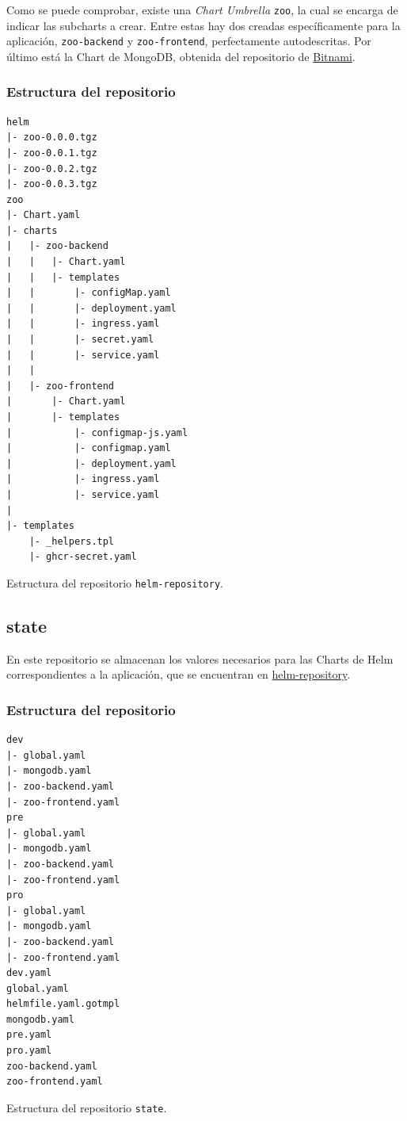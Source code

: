 Como se puede comprobar, existe una \textit{Chart Umbrella} \texttt{zoo}, la cual se encarga de indicar las subcharts a crear. Entre estas hay dos creadas específicamente para la aplicación, \texttt{zoo-backend} y \texttt{zoo-frontend}, perfectamente autodescritas. Por último está la Chart de MongoDB, obtenida del repositorio de \href{https://bitnami.com/stacks?stack=helm}{Bitnami}.

\subsubsection*{Estructura del repositorio}

\begin{longlisting}
  \begin{verbatim}
helm
|- zoo-0.0.0.tgz
|- zoo-0.0.1.tgz
|- zoo-0.0.2.tgz
|- zoo-0.0.3.tgz
zoo
|- Chart.yaml
|- charts
|   |- zoo-backend
|   |   |- Chart.yaml
|   |   |- templates
|   |       |- configMap.yaml
|   |       |- deployment.yaml
|   |       |- ingress.yaml
|   |       |- secret.yaml
|   |       |- service.yaml
|   |
|   |- zoo-frontend
|       |- Chart.yaml
|       |- templates
|           |- configmap-js.yaml
|           |- configmap.yaml
|           |- deployment.yaml
|           |- ingress.yaml
|           |- service.yaml
|   
|- templates
    |- _helpers.tpl
    |- ghcr-secret.yaml
  \end{verbatim}
  \caption{Estructura del repositorio \texttt{helm-repository}.}
\end{longlisting}

\subsection{state}

En este repositorio se almacenan los valores necesarios para las Charts de Helm correspondientes a la aplicación, que se encuentran en \href{https://github.com/vieites-tfg/helm-repository}{helm-repository}.

\subsubsection*{Estructura del repositorio}

\begin{listing}[!ht]
  \begin{verbatim}
dev
|- global.yaml
|- mongodb.yaml
|- zoo-backend.yaml
|- zoo-frontend.yaml
pre
|- global.yaml
|- mongodb.yaml
|- zoo-backend.yaml
|- zoo-frontend.yaml
pro
|- global.yaml
|- mongodb.yaml
|- zoo-backend.yaml
|- zoo-frontend.yaml
dev.yaml
global.yaml
helmfile.yaml.gotmpl
mongodb.yaml
pre.yaml
pro.yaml
zoo-backend.yaml
zoo-frontend.yaml
  \end{verbatim}
  \caption{Estructura del repositorio \texttt{state}.}
\end{listing}

